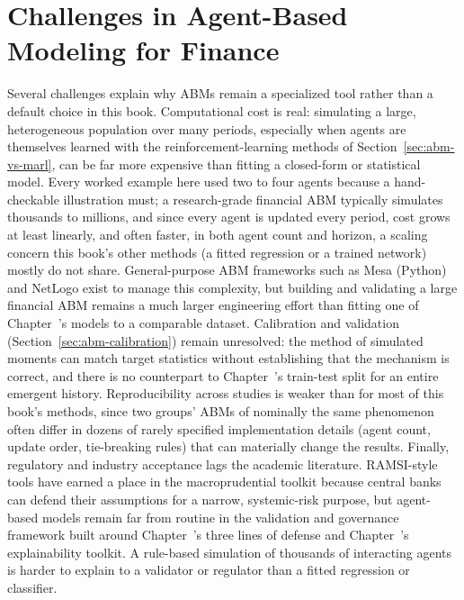 \documentclass[../ai_in_finance]{subfiles}
\begin{document}
\section{Challenges in Agent-Based Modeling for Finance}

Several challenges explain why ABMs remain a specialized tool rather than a default choice in this book. Computational cost is real: simulating a large, heterogeneous population over many periods, especially when agents are themselves learned with the reinforcement-learning methods of Section~\ref{sec:abm-vs-marl}, can be far more expensive than fitting a closed-form or statistical model. Every worked example here used two to four agents because a hand-checkable illustration must; a research-grade financial ABM typically simulates thousands to millions, and since every agent is updated every period, cost grows at least linearly, and often faster, in both agent count and horizon, a scaling concern this book's other methods (a fitted regression or a trained network) mostly do not share. General-purpose ABM frameworks such as Mesa (Python) and NetLogo exist to manage this complexity, but building and validating a large financial ABM remains a much larger engineering effort than fitting one of Chapter~'s models to a comparable dataset. Calibration and validation (Section~\ref{sec:abm-calibration}) remain unresolved: the method of simulated moments can match target statistics without establishing that the mechanism is correct, and there is no counterpart to Chapter~'s train-test split for an entire emergent history. Reproducibility across studies is weaker than for most of this book's methods, since two groups' ABMs of nominally the same phenomenon often differ in dozens of rarely specified implementation details (agent count, update order, tie-breaking rules) that can materially change the results. Finally, regulatory and industry acceptance lags the academic literature. RAMSI-style tools have earned a place in the macroprudential toolkit because central banks can defend their assumptions for a narrow, systemic-risk purpose, but agent-based models remain far from routine in the validation and governance framework built around Chapter~'s three lines of defense and Chapter~'s explainability toolkit. A rule-based simulation of thousands of interacting agents is harder to explain to a validator or regulator than a fitted regression or classifier.
\end{document}
